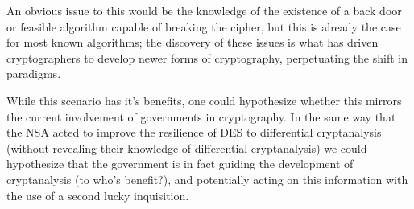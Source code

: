 \documentclass[british,10pt,a4paper]{article}
\begin{document}
An obvious issue to this would be the knowledge of the existence of a back door or feasible algorithm capable of breaking the cipher, but this is already the case for most known algorithms; the discovery of these issues is what has driven cryptographers to develop newer forms of cryptography, perpetuating the shift in paradigms. 

While this scenario has it's benefits, one could hypothesize whether this mirrors the current involvement of governments in cryptography. In the same way that the NSA acted to improve the resilience of DES to differential cryptanalysis (without revealing their knowledge of differential cryptanalysis) we could hypothesize that the government is in fact guiding the development of cryptanalysis (to who's benefit?), and potentially acting on this information with the use of a second lucky inquisition.
\end{document}
